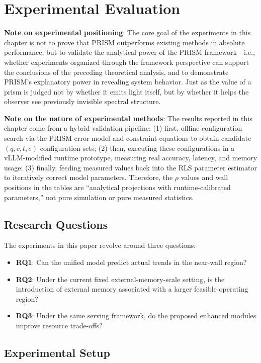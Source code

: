 \documentclass[11pt,a4paper]{article}
\theoremstyle{plain}
\theoremstyle{definition}
\begin{document}
\section{Experimental Evaluation}

\noindent\textbf{Note on experimental positioning}: The core goal of the experiments in this chapter is not to prove that PRISM outperforms existing methods in absolute performance, but to validate the analytical power of the PRISM framework---i.e., whether experiments organized through the framework perspective can support the conclusions of the preceding theoretical analysis, and to demonstrate PRISM's explanatory power in revealing system behavior. Just as the value of a prism is judged not by whether it emits light itself, but by whether it helps the observer see previously invisible spectral structure.

\noindent\textbf{Note on the nature of experimental methods}: The results reported in this chapter come from a hybrid validation pipeline: (1) first, offline configuration search via the PRISM error model and constraint equations to obtain candidate $(q,c,t,e)$ configuration sets; (2) then, executing these configurations in a vLLM-modified runtime prototype, measuring real accuracy, latency, and memory usage; (3) finally, feeding measured values back into the RLS parameter estimator to iteratively correct model parameters. Therefore, the $\rho$ values and wall positions in the tables are ``analytical projections with runtime-calibrated parameters,'' not pure simulation or pure measured statistics.

\subsection{Research Questions}

The experiments in this paper revolve around three questions:
\begin{itemize}
    \item \textbf{RQ1}: Can the unified model predict actual trends in the near-wall region?
    \item \textbf{RQ2}: Under the current fixed external-memory-scale setting, is the introduction of external memory associated with a larger feasible operating region?
    \item \textbf{RQ3}: Under the same serving framework, do the proposed enhanced modules improve resource trade-offs?
\end{itemize}

\subsection{Experimental Setup}
\end{document}
